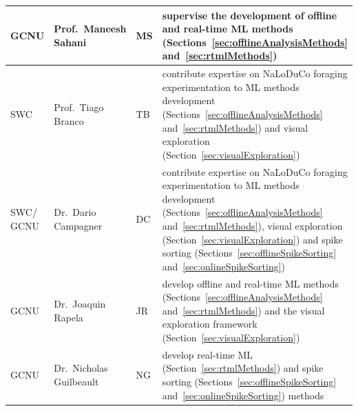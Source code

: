 
\begin{tabular}{|p{1.3cm}|p{4cm}|p{0.5cm}|p{10cm}|}
    \hline
    GCNU & Prof.~Maneesh Sahani & MS & supervise the development of offline and
    real-time ML methods (Sections~\ref{sec:offlineAnalysisMethods}
    and~\ref{sec:rtmlMethods})\\
    \hline
    SWC & Prof.~Tiago Branco & TB & contribute expertise on NaLoDuCo
    foraging experimentation to ML methods development
    (Sections~\ref{sec:offlineAnalysisMethods} and~\ref{sec:rtmlMethods})
    and visual exploration (Section~\ref{sec:visualExploration})\\
    \hline
    SWC/ GCNU & Dr.~Dario Campagner & DC & contribute expertise on NaLoDuCo
    foraging experimentation to ML methods development
    (Sections~\ref{sec:offlineAnalysisMethods} and~\ref{sec:rtmlMethods}),
    visual exploration (Section~\ref{sec:visualExploration}) and spike sorting
    (Sections~\ref{sec:offlineSpikeSorting} and~\ref{sec:onlineSpikeSorting})\\
    \hline
    GCNU & Dr.~Joaquin Rapela & JR & develop offline and real-time ML methods
    (Sections~\ref{sec:offlineAnalysisMethods} and~\ref{sec:rtmlMethods}) and
    the visual exploration framework (Section~\ref{sec:visualExploration})\\
    \hline
    GCNU & Dr.~Nicholas Guilbeault & NG & develop real-time ML
    (Section~\ref{sec:rtmlMethods}) and
    spike sorting (Sections~\ref{sec:offlineSpikeSorting}
    and~\ref{sec:onlineSpikeSorting}) methods \\
    \hline
\end{tabular}
